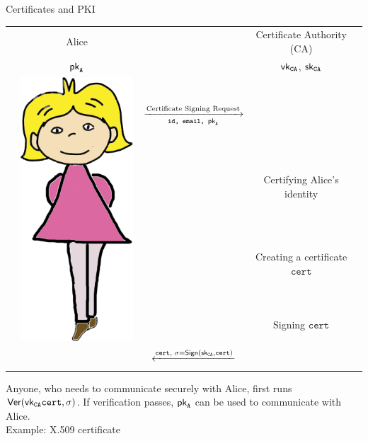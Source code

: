 \documentclass[usenames,dvipsnames, 9pt]{beamer}
\begin{document}
\begin{frame}{Certificates and PKI}
\begin{center}
	\begin{tabular}{l c c c l}
		& \Large Alice & &\Large Certificate Authority (CA)&  \\ 
		&  $\textsf{pk}_{\texttt{A}}$  & & $\textsf{vk}_{\texttt{CA}}$, $\textsf{sk}_{\texttt{CA}}$ & \\
		& \multirow{5}{*}{\includegraphics[scale=0.15]{Alice}} & & &  \\  \pause
		& & $\xrightarrow[\texttt{id, email, } \textsf{pk}_{\texttt{A}}]{\text {Certificate Signing Request}}$ & & \\  \pause
		& & & Certifying Alice’s identity & \\
		& & & Creating a certificate $\texttt{cert}$& \\
		& & & Signing $\texttt{cert}$& \\
		& & $\xleftarrow{\LARGE \texttt{cert}, \; \sigma = \Sign(\sk_{\texttt{CA}}, \texttt{cert})}$ & & \\  \pause
	\end{tabular}
\end{center}

\vspace{15pt}
\Large
Anyone, who needs to communicate securely with Alice, first runs $\textsf{Ver}(\textsf{vk}_{\texttt{CA}} \texttt{cert},\sigma )$. If verification passes, $\textsf{pk}_{\texttt{A}}$ can be used to communicate with Alice.\\[10pt]

Example: X.509 certificate
\end{frame}
\end{document}
